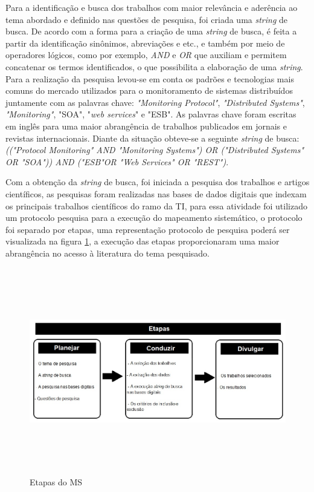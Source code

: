 Para a identificação e busca dos trabalhos com maior relevância e aderência ao tema abordado e definido nas questões de pesquisa, foi criada uma \textit{string} de busca. De acordo com \cite{keele2007guidelines} a forma para a criação de uma \textit{string} de busca, é feita a partir da identificação sinônimos, abreviações e etc., e também por meio de operadores lógicos, como por exemplo, \textit{AND} e \textit{OR} que auxiliam e permitem concatenar os termos identificados, o que possibilita a elaboração de uma \textit{string}. Para a realização da pesquisa levou-se em conta os padrões e tecnologias mais comuns do mercado utilizados para o monitoramento de sistemas distribuídos juntamente com as palavras chave: \textit{"Monitoring Protocol"}, \textit{"Distributed Systems"}, \textit{"Monitoring"}, "\acrshort{SOA}", "\textit{web services}" e "\acrshort{ESB}". As palavras chave foram escritas em inglês para uma maior abrangência de trabalhos publicados em jornais e revistas internacionais. Diante da situação obteve-se a seguinte \textit{string} de busca: \textit{(("Protocol Monitoring" AND "Monitoring Systems") OR ("Distributed Systems" OR "SOA")) AND ("ESB"OR "Web Services" OR "REST")}.

Com a obtenção da \textit{string} de busca, foi iniciada a pesquisa dos trabalhos e artigos científicos, as pesquisas foram realizadas nas bases de dados digitais que indexam os principais trabalhos científicos do ramo da \acrlong{TI}, para essa atividade foi utilizado um protocolo pesquisa para a execução do mapeamento sistemático, o protocolo foi separado por etapas, uma representação protocolo de pesquisa poderá ser visualizada na figura \ref{fig:etapasRSL}, a execução das etapas proporcionaram uma maior abrangência no acesso à literatura do tema pesquisado\cite{kitchenham2007guidelines}.

\begin{figure}[!ht]
\centering
\includegraphics[width = 16cm, height=9cm]{img/etapas_RSL_final.jpg}
\caption{Etapas do \acrlong{MS}}
\label{fig:etapasRSL}
\end{figure}

